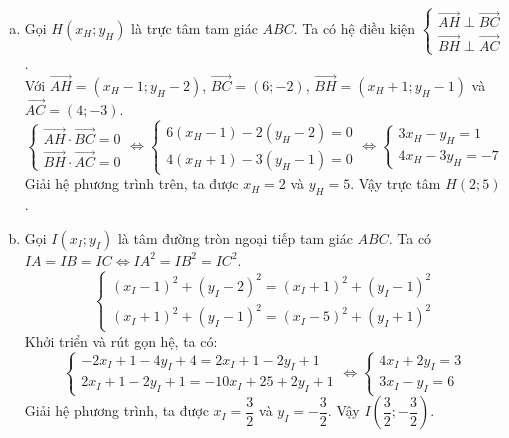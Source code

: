 \begin{vd}
{\begin{enumerate}[a)]
		\item Gọi $H(x_H; y_H)$ là trực tâm tam giác $ABC$. Ta có hệ điều kiện $\begin{cases} \overrightarrow{AH} \perp \overrightarrow{BC} \\ \overrightarrow{BH} \perp \overrightarrow{AC} \end{cases}$.\\
		Với $\overrightarrow{AH} = (x_H - 1; y_H - 2)$, $\overrightarrow{BC} = (6; -2)$, $\overrightarrow{BH} = (x_H + 1; y_H - 1)$ và $\overrightarrow{AC} = (4; -3)$.
		\[ \begin{cases} \overrightarrow{AH} \cdot \overrightarrow{BC} = 0 \\ \overrightarrow{BH} \cdot \overrightarrow{AC} = 0 \end{cases} \Leftrightarrow \begin{cases} 6(x_H - 1) - 2(y_H - 2) = 0 \\ 4(x_H + 1) - 3(y_H - 1) = 0 \end{cases} \Leftrightarrow \begin{cases} 3x_H - y_H = 1 \\ 4x_H - 3y_H = -7 \end{cases} \]
		Giải hệ phương trình trên, ta được $x_H = 2$ và $y_H = 5$. Vậy trực tâm $H(2; 5)$.
		
		\item Gọi $I(x_I; y_I)$ là tâm đường tròn ngoại tiếp tam giác $ABC$. Ta có $IA = IB = IC \Leftrightarrow IA^2 = IB^2 = IC^2$.
		\[ \begin{cases} (x_I - 1)^2 + (y_I - 2)^2 = (x_I + 1)^2 + (y_I - 1)^2 \\ (x_I + 1)^2 + (y_I - 1)^2 = (x_I - 5)^2 + (y_I + 1)^2 \end{cases} \]
		Khởi triển và rút gọn hệ, ta có:
		\[ \begin{cases} -2x_I + 1 - 4y_I + 4 = 2x_I + 1 - 2y_I + 1 \\ 2x_I + 1 - 2y_I + 1 = -10x_I + 25 + 2y_I + 1 \end{cases} \Leftrightarrow \begin{cases} 4x_I + 2y_I = 3 \\ 3x_I - y_I = 6 \end{cases} \]
		Giải hệ phương trình, ta được $x_I = \dfrac{3}{2}$ và $y_I = -\dfrac{3}{2}$. Vậy $I\left(\dfrac{3}{2}; -\dfrac{3}{2}\right)$.
		

\end{enumerate}}
\end{vd}
